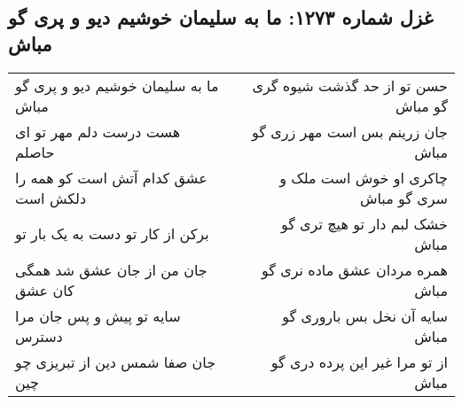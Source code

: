 \begin{center}
\section*{غزل شماره ۱۲۷۳: ما به سلیمان خوشیم دیو و پری گو مباش}
\label{sec:1273}
\begin{longtable}{l p{0.5cm} r}
ما به سلیمان خوشیم دیو و پری گو مباش
&&
حسن تو از حد گذشت شیوه گری گو مباش
\\
هست درست دلم مهر تو ای حاصلم
&&
جان زرینم بس است مهر زری گو مباش
\\
عشق کدام آتش است کو همه را دلکش است
&&
چاکری او خوش است ملک و سری گو مباش
\\
برکن از کار تو دست به یک بار تو
&&
خشک لبم دار تو هیچ تری گو مباش
\\
جان من از جان عشق شد همگی کان عشق
&&
همره مردان عشق ماده نری گو مباش
\\
سایه تو پیش و پس جان مرا دسترس
&&
سایه آن نخل بس باروری گو مباش
\\
جان صفا شمس دین از تبریزی چو چین
&&
از تو مرا غیر این پرده دری گو مباش
\\
\end{longtable}
\end{center}
